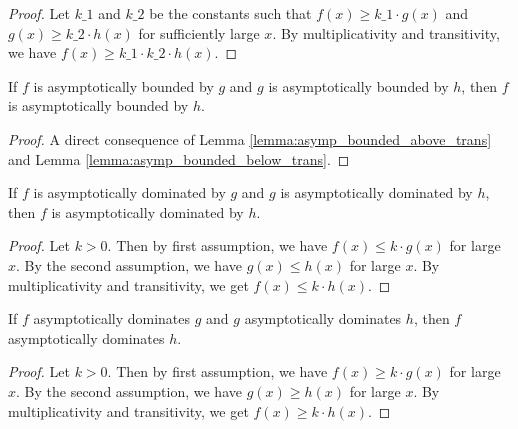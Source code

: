 \begin{proof}
    \leanok
    Let $k\_1$ and $k\_2$ be the constants such that $f(x) \ge k\_1 \cdot g(x)$ and
    $g(x) \ge k\_2 \cdot h(x)$ for sufficiently large $x$. By multiplicativity and 
    transitivity, we have $f(x) \ge k\_1 \cdot k\_2 \cdot h(x)$.
\end{proof}

\begin{lemma}
    \label{lemma:asymp_bounded_trans}
    \leanok
    If $f$ is asymptotically bounded by $g$ and $g$ is asymptotically bounded 
    by $h$, then $f$ is asymptotically bounded by $h$.
\end{lemma}

\begin{proof}
    \leanok
    A direct consequence of Lemma \ref{lemma:asymp_bounded_above_trans} and Lemma
    \ref{lemma:asymp_bounded_below_trans}.
\end{proof}

\begin{lemma}
    \label{lemma:asymp_right_dom_trans}
    \leanok
    If $f$ is asymptotically dominated by $g$ and $g$ is asymptotically dominated by $h$, then 
    $f$ is asymptotically dominated by $h$.
\end{lemma}

\begin{proof}
    \leanok
    Let $k > 0$. Then by first assumption, we have $f(x) \le k \cdot g(x)$ for large 
    $x$. By the second assumption, we have $g(x) \le h(x)$ for large $x$. By multiplicativity 
    and transitivity, we get $f(x) \le k \cdot h(x)$.
\end{proof}

\begin{lemma}
    \label{lemma:asymp_left_dom_trans}
    \leanok
    If $f$ asymptotically dominates $g$ and $g$ asymptotically dominates $h$, then 
    $f$ asymptotically dominates $h$.
\end{lemma}

\begin{proof}
    \leanok
    Let $k > 0$. Then by first assumption, we have $f(x) \ge k \cdot g(x)$ for large 
    $x$. By the second assumption, we have $g(x) \ge h(x)$ for large $x$. By multiplicativity 
    and transitivity, we get $f(x) \ge k \cdot h(x)$.
\end{proof}


